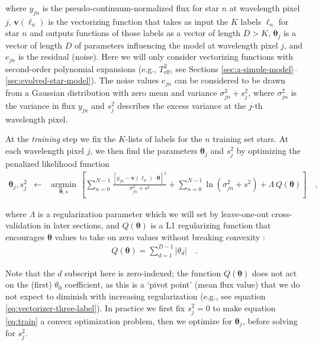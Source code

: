 \documentclass[preprint]{aastex61}
\newcommand{\teff}{T_{\mathrm{eff}}}
\newcommand{\Dvector}[1]{\boldsymbol{#1}}
\newcommand{\vectheta}{\Dvector{\theta}}
\newcommand{\vecv}{\Dvector{v}}
\newcommand{\argmin}[1]{\underset{#1}{\operatorname{argmin}}\,}
\begin{document}
\noindent{}where $y_{jn}$ is the pseudo-continuum-normalized flux for star $n$ at wavelength pixel
$j$, $\vecv(\ell_n)$ is the vectorizing function that takes as input the $K$ labels
$\ell_n$ for star $n$ and outputs functions of those labels as a vector of length
$D>K$, $\vectheta_j$ is a vector of length $D$ of parameters influencing the model at
wavelength pixel $j$, and $e_{jn}$ is the residual (noise).  Here we will only consider
vectorizing functions with second-order polynomial expansions (e.g., $\teff^2$, see Sections 
\ref{sec:a-simple-model}--\ref{sec:evolved-star-model}).  The noise values $e_{jn}$ can 
be considered to be drawn from a Gaussian distribution with zero mean and variance 
$\sigma_{jn}^2 + s_j^2$, where $\sigma_{jn}^2$ is the variance in flux $y_{jn}$ and 
$s_j^2$ describes the excess variance at the $j$-th wavelength pixel. 


At the \emph{training} step we fix the $K$-lists of labels for the $n$ training set stars.
At each wavelength pixel $j$, we then find the parameters $\vectheta_j$ and $s_j^2$
by optimizing the penalized likelihood function
\begin{eqnarray}\label{eq:train}
\vectheta_j,s^2_j &\leftarrow& \argmin{\vectheta,s}\left[
    \sum_{n=0}^{N-1} \frac{[y_{jn}-\vecv(\ell_n)\cdot\vectheta]^2}{\sigma^2_{jn}+s^2}
    + \sum_{n=0}^{N-1} \ln(\sigma^2_{jn}+s^2) + \Lambda{}\,Q(\vectheta)
    \right]
  \quad ,
\end{eqnarray}

\noindent{}where $\Lambda$ is a regularization parameter which we will set by leave-one-out 
cross-validation in later sections, and $Q(\vectheta)$ is a L1 regularizing function 
\citep[e.g., see \emph{LASSO} in][and related literature]{Tibshirani_1996} that encourages 
$\vectheta$ values to take on zero values without breaking convexity \citep{Casey_2016b}:
\begin{eqnarray}\label{eq:regularization-function}
	Q(\vectheta) = \sum_{d=1}^{D-1} |{\theta_d}| \quad .
\end{eqnarray}

Note that the $d$ subscript here is zero-indexed; the function $Q(\vectheta)$ does not act
on the (first) $\theta_0$ coefficient, as this is a `pivot point' (mean flux value) that 
we do not expect to diminish with increasing regularization (e.g., see equation 
\ref{eq:vectorizer-three-label}).  In practice we first fix $s_j^2 = 0$ to make equation
\ref{eq:train} a convex optimization problem, then we optimize for $\vectheta_j$, before 
solving for $s_j^2$.  
\end{document}

